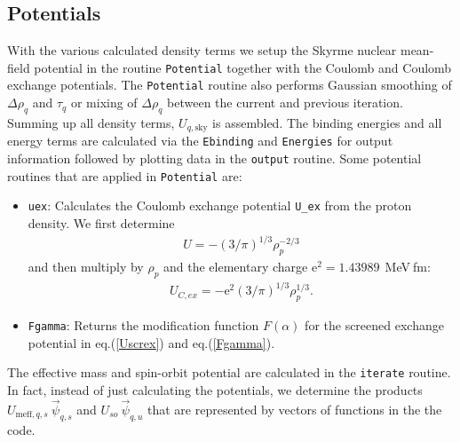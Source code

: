 \documentclass[3p]{elsarticle}
\begin{document}
\subsection{Potentials}
\label{section::potential}
With the various calculated density terms we setup the Skyrme nuclear mean-field potential in the routine \texttt{Potential} together with the Coulomb and Coulomb exchange potentials. The \texttt{Potential} routine also performs Gaussian smoothing of $\Delta \rho_q$ and $\tau_q$ or mixing of $\Delta \rho_q$ between the current and previous iteration. Summing up all density terms, $U_{q,\mathrm{sky}}$ is assembled. The binding energies and all energy terms are calculated via the \texttt{Ebinding} and \texttt{Energies} for output information followed by plotting data in the \texttt{output} routine. Some potential routines that are applied in \texttt{Potential} are:
\begin{itemize}
\item \texttt{uex}: Calculates the Coulomb exchange potential \texttt{U\_{ex}} from the proton density. We first determine 
\begin{align}
U = - \left( 3 / \pi \right)^{1/3} \rho_p^{-2/3}
\end{align}
and then multiply by $\rho_p$ and the elementary charge $\mathrm{e}^2 = 1.43989\:\:$MeV$\:$fm:
\begin{align}
U_{C,ex} = - \mathrm{e}^2 \left(3 / \pi \right)^{1/3} \rho_p^{1/3}.
\end{align}
\item \texttt{Fgamma}: Returns the modification function $F(\alpha)$ for the screened exchange potential in eq.(\ref{Uscrex}) and eq.(\ref{Fgamma}). 
\end{itemize}
The effective mass and spin-orbit potential are calculated in the \texttt{iterate} routine. In fact, instead of just calculating the potentials, we determine the products $U_{\mathrm{meff},q,s} \: \vec{\psi}_{q,s}$ and $U_{so} \: \vec{\psi}_{q,u}$ that are represented by vectors of functions in the the code. 
\end{document}
